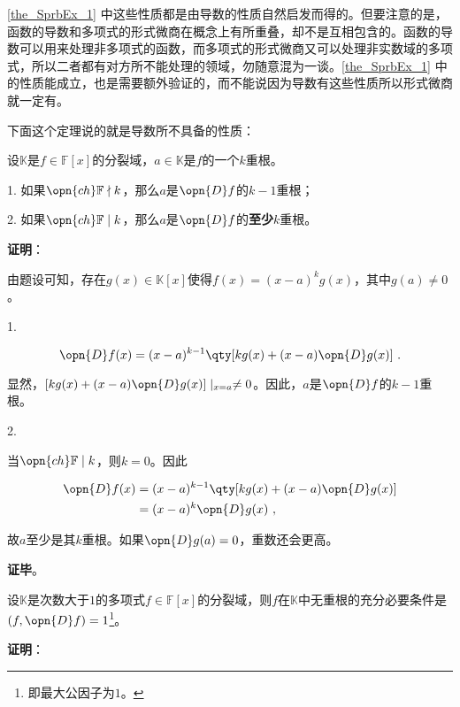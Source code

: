 \autoref{the_SprbEx_1} 中这些性质都是由导数的性质自然启发而得的。但要注意的是，函数的导数和多项式的形式微商在概念上有所重叠，却不是互相包含的。函数的导数可以用来处理非多项式的函数，而多项式的形式微商又可以处理非实数域的多项式，所以二者都有对方所不能处理的领域，勿随意混为一谈。\autoref{the_SprbEx_1} 中的性质能成立，也是需要额外验证的，而不能说因为导数有这些性质所以形式微商就一定有。

下面这个定理说的就是导数所不具备的性质：

\begin{theorem}{}\label{the_SprbEx_2}
设$\mathbb{K}$是$f\in\mathbb{F}[x]$的分裂域，$a\in\mathbb{K}$是$f$的一个$k$重根。

1. 如果$\opn{ch}\mathbb{F}\nmid k$，那么$a$是$\opn{D}f$的$k-1$重根；

2. 如果$\opn{ch}\mathbb{F}\mid k$，那么$a$是$\opn{D}f$的\textbf{至少}$k$重根。
\end{theorem}

\textbf{证明}：

由题设可知，存在$g(x)\in\mathbb{K}[x]$使得$f(x) = (x-a)^k g(x)$，其中$g(a)\neq 0$。

1. 

\begin{equation}
\opn{D}f(x)=(x-a)^{k-1}\qty[kg(x)+(x-a)\opn{D}g(x)]~.
\end{equation}

显然，$[kg(x)+(x-a)\opn{D}g(x)]\mid_{x=a}\neq 0$。因此，$a$是$\opn{D}f$的$k-1$重根。


2. 

当$\opn{ch}\mathbb{F}\mid k$，则$k=0$。因此

\begin{equation}
\begin{aligned}
\opn{D}f(x)&=(x-a)^{k-1}\qty[kg(x)+(x-a)\opn{D}g(x)]\\
&=(x-a)^k\opn{D}g(x)~,
\end{aligned}
\end{equation}

故$a$至少是其$k$重根。如果$\opn{D}g(a)=0$，重数还会更高。

\textbf{证毕}。



\begin{corollary}{}\label{cor_SprbEx_1}
设$\mathbb{K}$是次数大于$1$的多项式$f\in\mathbb{F}[x]$的分裂域，则$f$在$\mathbb{K}$中无重根的充分必要条件是$(f, \opn{D}f)=1$\footnote{即最大公因子为$1$。}。
\end{corollary}

\textbf{证明}：

